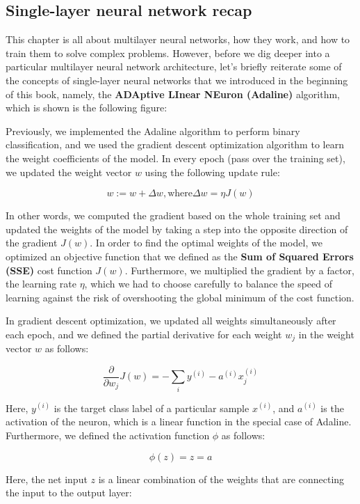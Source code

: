 \documentclass[11pt]{article}
\begin{document}
    \subsection{Single-layer neural network
recap}\label{single-layer-neural-network-recap}

    This chapter is all about multilayer neural networks, how they work, and
how to train them to solve complex problems. However, before we dig
deeper into a particular multilayer neural network architecture, let's
briefly reiterate some of the concepts of single-layer neural networks
that we introduced in the beginning of this book, namely, the
\textbf{ADAptive LInear NEuron (Adaline)} algorithm, which is shown is
the following figure:

Previously, we implemented the Adaline algorithm to perform binary
classification, and we used the gradient descent optimization algorithm
to learn the weight coefficients of the model. In every epoch (pass over
the training set), we updated the weight vector \(w\) using the
following update rule:

\[w := w + \Delta w, \text{where} \Delta w = \eta J(w)\]

In other words, we computed the gradient based on the whole training set
and updated the weights of the model by taking a step into the opposite
direction of the gradient \(J(w)\). In order to find the optimal weights
of the model, we optimized an objective function that we defined as the
\textbf{Sum of Squared Errors (SSE)} cost function \(J(w)\).
Furthermore, we multiplied the gradient by a factor, the learning rate
\(\eta\), which we had to choose carefully to balance the speed of
learning against the risk of overshooting the global minimum of the cost
function.

In gradient descent optimization, we updated all weights simultaneously
after each epoch, and we defined the partial derivative for each weight
\(w_j\) in the weight vector \(w\) as follows:

\[\frac{\partial}{\partial w_j}J(w) = -\sum_i{y^{(i)} - a^{(i)}}x^{(i)}_j\]

Here, \(y^{(i)}\) is the target class label of a particular sample
\(x^{(i)}\), and \(a^{(i)}\) is the activation of the neuron, which is a
linear function in the special case of Adaline. Furthermore, we defined
the activation function \(\phi\) as follows:

\[\phi(z) = z = a\]

Here, the net input \(z\) is a linear combination of the weights that
are connecting the input to the output layer:
\end{document}
